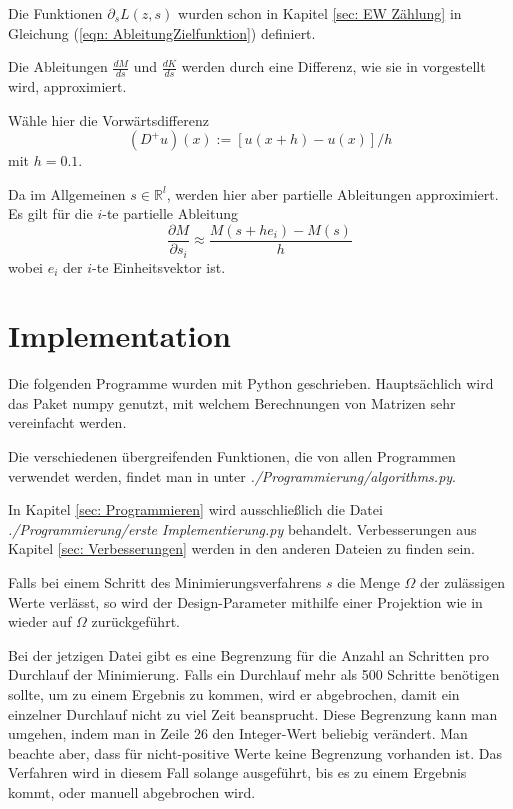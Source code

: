 \documentclass[a4paper,12pt]{report}
\newcommand{\R}{\mathbb R}
\newcommand{\zitat}[1]{\glqq #1\grqq}
\newcommand{\1}{\mathds{1}}
\theoremstyle{plain} %
\theoremstyle{definition} %
\theoremstyle{remark}
\begin{document}
            Die Funktionen $\partial_s L(z, s)$ wurden schon in Kapitel \ref{sec: EW Zählung} in Gleichung (\ref{eqn: AbleitungZielfunktion}) definiert.

            Die Ableitungen $\frac{d M}{d s}$ und $\frac{d K}{d s}$ werden durch eine Differenz, wie sie in \cite[S. 16 f.]{numerikGrossmann} vorgestellt wird, approximiert.

            Wähle hier die Vorwärtsdifferenz $$(D^+u)(x):=[u(x+h)-u(x)]/h $$mit $h=0.1$.

            Da im Allgemeinen $s\in \R^l$, werden hier aber partielle Ableitungen approximiert.
            Es gilt für die $i$-te partielle Ableitung
            $$\frac{\partial M}{\partial s_i}\approx \frac{M(s+h e_i)-M(s)}{h}$$
            wobei $e_i$ der $i$-te Einheitsvektor ist.
 
      \section{Implementation}
            Die folgenden Programme wurden mit Python geschrieben. Hauptsächlich wird das Paket \zitat{numpy} genutzt,
            mit welchem Berechnungen von Matrizen sehr vereinfacht werden.

            Die verschiedenen übergreifenden Funktionen, die von allen Programmen verwendet werden, findet man in \cite{github}
            unter {\textit{./Programmierung/algorithms.py}}.

            In Kapitel \ref{sec: Programmieren} wird ausschließlich die Datei {\textit{./Programmierung/erste Implementierung.py}} behandelt.
            Verbesserungen aus Kapitel \ref{sec: Verbesserungen} werden in den anderen Dateien zu finden sein.
            
            Falls bei einem Schritt des Minimierungsverfahrens $s$ die Menge $\Omega$ der zulässigen Werte verlässt,
            so wird der Design-Parameter mithilfe einer Projektion wie in \cite[S. 314]{optimierungJarreProjektion} wieder auf $\Omega$ zurückgeführt.
            
            Bei der jetzigen Datei gibt es eine Begrenzung für die Anzahl an Schritten pro Durchlauf der Minimierung.
            Falls ein Durchlauf mehr als 500 Schritte benötigen sollte, um zu einem Ergebnis zu kommen, wird er abgebrochen, damit ein einzelner Durchlauf nicht zu viel Zeit beansprucht.
            Diese Begrenzung kann man umgehen, indem man in Zeile 26 den Integer-Wert beliebig verändert. Man beachte aber, dass für nicht-positive Werte keine Begrenzung vorhanden ist.
            Das Verfahren wird in diesem Fall solange ausgeführt, bis es zu einem Ergebnis kommt, oder manuell abgebrochen wird.
\end{document}
